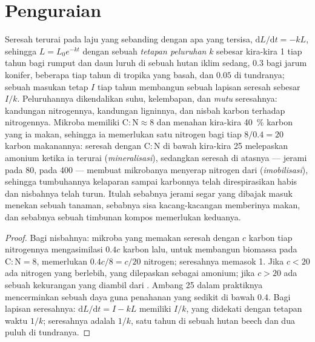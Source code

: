 \section{Penguraian}

\begin{theorem}\label{thm:b2:living-soil:decay}
Seresah terurai pada laju yang sebanding dengan apa yang tersisa,
$\mathrm{d}L/\mathrm{d}t = -kL$, sehingga $L = L_0 e^{-kt}$ dengan
sebuah \emph{tetapan peluruhan} $k$ sebesar kira-kira 1 tiap tahun bagi
rumput dan daun luruh di sebuah hutan iklim sedang, $0.3$ bagi jarum
konifer, beberapa tiap tahun di tropika yang basah, dan $0.05$ di
tundranya; sebuah masukan tetap $I$ tiap tahun membangun sebuah lapisan
seresah sebesar $I/k$. Peluruhannya dikendalikan suhu, kelembapan, dan
\emph{mutu} seresahnya: kandungan nitrogennya, kandungan ligninnya, dan
nisbah karbon terhadap nitrogennya. Mikroba memiliki $\mathrm{C:N} \approx 8$ dan menahan kira-kira \qty{40}{\%} karbon yang ia makan,
sehingga ia memerlukan satu nitrogen bagi tiap $8/0.4 = 20$ karbon
makanannya: seresah dengan $\mathrm{C:N}$ di bawah kira-kira 25
melepaskan amonium ketika ia terurai (\emph{mineralisasi}), sedangkan
seresah di atasnya --- jerami pada 80,  pada 400 --- membuat
mikrobanya menyerap nitrogen dari  (\emph{imobilisasi}),
sehingga tumbuhannya kelaparan sampai karbonnya telah direspirasikan
habis dan nisbahnya telah turun. Itulah sebabnya jerami segar yang
dibajak masuk menekan sebuah tanaman, sebabnya sisa kacang-kacangan
memberinya makan, dan sebabnya sebuah timbunan kompos memerlukan
keduanya.
\end{theorem}
\begin{proof}
Bagi nisbahnya: mikroba yang memakan seresah dengan $c$ karbon tiap
nitrogennya mengasimilasi $0.4c$ karbon lalu, untuk membangun biomassa
pada $\mathrm{C:N} = 8$, memerlukan $0.4c/8 = c/20$ nitrogen;
seresahnya memasok 1. Jika $c < 20$ ada nitrogen yang berlebih, yang
dilepaskan sebagai amonium; jika $c > 20$ ada sebuah kekurangan yang
diambil dari . Ambang 25 dalam praktiknya mencerminkan sebuah
daya guna penahanan yang sedikit di bawah 0.4. Bagi lapisan seresahnya:
$\mathrm{d}L/\mathrm{d}t = I - kL$ memiliki  $I/k$, yang
didekati dengan tetapan waktu $1/k$;  seresahnya adalah
$1/k$, satu tahun di sebuah hutan beech dan dua puluh di tundranya.
\end{proof}

